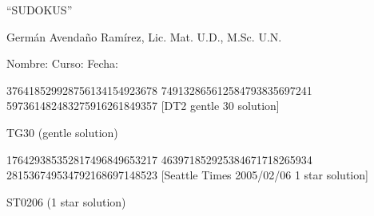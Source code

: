 \documentclass{article}
\begin{document}
\begin{center}
\large ``SUDOKUS''
\end{center}
\begin{center}
Germ\'an Avenda\~no Ram\'irez, Lic. Mat. U.D., M.Sc. U.N.
\end{center}
Nombre: \hrulefill Curso: \underline{\hspace*{44pt}} Fecha: \underline{\hspace*{2.5cm}}
\cluefont{\Large}

\begin{center}
\renewcommand*{\puzzlefile}{tg30.ans}
\writepuzzle%
{376418529}{928756134}{154923678}%
{749132865}{612584793}{835697241}%
{597361482}{483275916}{261849357}%
[DT2 gentle 30 solution]
\vfill
\begin{minipage}{0.47\linewidth}\begin{center}
TG30 (gentle solution) \\
\end{center}\end{minipage}
\end{center}

\begin{center}
\renewcommand*{\puzzlefile}{st0206.ans}
\writepuzzle%
{176429385}{352817496}{849653217}%
{463971852}{925384671}{718265934}%
{281536749}{534792168}{697148523}%
[Seattle Times 2005/02/06 1 star solution]
\vfill
\begin{minipage}{0.47\linewidth}\begin{center}
ST0206 (1 star solution) \\
\end{center}\end{minipage}
\end{center}
\end{document}
